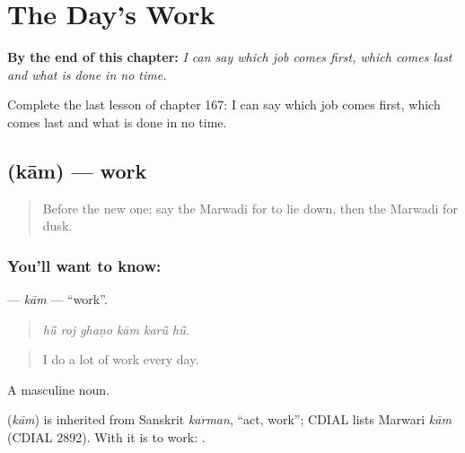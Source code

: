 
\chapter{The Day's Work}
\label{ch:mw-the-day-s-work}

\begin{chapteropening}
\textbf{By the end of this chapter:} \emph{I can say which job comes first, which comes last and what is done in no time.}

Complete the last lesson of chapter 167: I can say which job comes first, which comes last and what is done in no time.
\end{chapteropening}

\section[\texorpdfstring{\mw{काम} (kām)}{काम (kām)}]{ (kām) — work}

\label{lesson:MW-C167-kam}



\begin{quote}
Before the new one: say the Marwadi for to lie down, then the Marwadi for dusk.
\end{quote}

\subsection*{You'll want to know: }
\textbf{} — \emph{kām} — \textquotedblleft{}work\textquotedblright{}.

\begin{quote}
     
\end{quote}

\begin{quote}
\emph{hū̃ roj ghaṇo kām karū̃ hū̃.}
\end{quote}

\begin{quote}
I do a lot of work every day.
\end{quote}

A masculine noun.

\begin{cousinweb}
\textbf{} (\emph{kām}) is inherited from Sanskrit \emph{karman}, \textquotedblleft{}act, work\textquotedblright{}; CDIAL lists Marwari \emph{kām} (CDIAL 2892). With \textbf{} it is to work: \textbf{ }.
\end{cousinweb}

